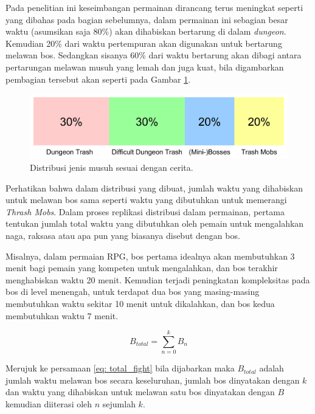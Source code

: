 \begin{subs}
\begin{enumerate}[label=\textbf{\arabic*).}]
		Pada penelitian ini keseimbangan permainan dirancang terus meningkat seperti yang dibahas pada bagian sebelumnya, dalam permainan ini sebagian besar waktu (asumsikan saja 80\%) akan dihabiskan bertarung di dalam \textit{dungeon}. Kemudian 20\% dari waktu pertempuran akan digunakan untuk bertarung melawan bos. Sedangkan sisanya 60\% dari waktu bertarung akan dibagi antara pertarungan melawan musuh yang lemah dan juga kuat, bila digambarkan pembagian tersebut akan seperti pada Gambar \ref{fig:enemy_difficulty_percentage}.
		
		\begin{figure} [!h] \centering
			\includegraphics[scale=0.12]{img/enemy_type_distribution.png}
			\caption{Distribusi jenis musuh sesuai dengan cerita.}
			\label{fig:enemy_difficulty_percentage}
		\end{figure}
		
		Perhatikan bahwa dalam distribusi yang dibuat, jumlah waktu yang dihabiskan untuk melawan bos sama seperti waktu yang dibutuhkan untuk memerangi \textit{Thrash Mobs}. Dalam proses replikasi distribusi dalam permainan, pertama tentukan jumlah total waktu yang dibutuhkan oleh pemain untuk mengalahkan naga, raksasa atau apa pun yang biasanya disebut dengan bos.
		\vspace{1ex}
		
		Misalnya, dalam permaian RPG, bos pertama idealnya akan membutuhkan 3 menit bagi pemain yang kompeten untuk mengalahkan, dan bos terakhir menghabiskan waktu 20 menit. Kemudian terjadi peningkatan kompleksitas pada bos di level menengah, untuk terdapat dua bos yang masing-masing membutuhkan waktu sekitar 10 menit untuk dikalahkan, dan bos kedua membutuhkan waktu 7 menit.
		\vspace{1ex}
		
		\begin{equation}
		\label{eq: total_fight}
		B_{total} = \sum_{n = 0}^{k} B_{n}
		\end{equation}
		
		Merujuk ke persamaan \ref{eq: total_fight} bila dijabarkan maka $B_{total}$ adalah jumlah waktu melawan bos secara keseluruhan, jumlah bos dinyatakan dengan $k$ dan waktu yang dihabiskan untuk melawan satu bos dinyatakan dengan $B$ kemudian diiterasi oleh $n$ sejumlah $k$.
		\vspace{1ex}
		

\end{enumerate}
\end{subs}
